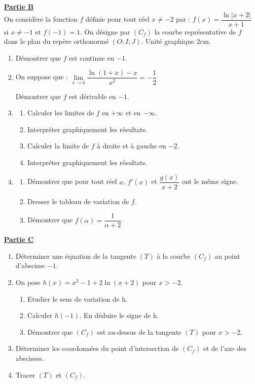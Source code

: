 \documentclass[12pt,a4paper]{article}
\begin{document}
\noindent \underline{\textbf{Partie B}} \\
On considère la fonction $f$ définie pour tout réel $x \neq -2$ par :
$f(x) = \dfrac{\ln|x + 2|}{x + 1}$ si $x \neq -1$ et $f(-1) = 1$.
On désigne par $(C_f)$ la courbe représentative de $f$ dans le plan du repère orthonormé $(O; I; J)$.
Unité graphique 2cm.
\begin{enumerate}
    \item Démontrer que $f$ est continue en $-1$.
    \item On suppose que : $\lim\limits_{x \to 0} \dfrac{\ln(1+x) - x}{x^2} = -\dfrac{1}{2}$
    
          Démontrer que $f$ est dérivable en $-1$.
    \item \begin{enumerate}
    			\item Calculer les limites de $f$ en $+\infty$ et en $-\infty$. 
    			\item Interpréter graphiquement les résultats. 
          \item Calculer la limite de $f$ à droite et à gauche en $-2$.
          \item Interpréter graphiquement les résultats.
    \end{enumerate}
    \item \begin{enumerate}
    			\item Démontrer que pour tout réel $x$, $f'(x)$ et $\dfrac{g(x)}{x+2}$ ont le même signe. 
          \item Dresser le tableau de variation de $f$. \\
          \item Démontrer que $f(\alpha) = \dfrac{1}{\alpha + 2}$.
    \end{enumerate}
\end{enumerate}

\vspace{0.3cm}

\noindent \underline{\textbf{Partie C}}
\begin{enumerate}
    \item Déterminer une équation de la tangente $(T)$ à la courbe $(C_f)$ au point d'abscisse $-1$.
    \item On pose $h(x) = x^2 - 1 + 2 \ln(x + 2)$ pour $x > -2$.
		\begin{enumerate}
    \item Etudier le sens de variation de h.
    \item Calculer $h(-1)$. En déduire le signe de h.
    \item Démontrer que $(C_f)$ est au-dessus de la tangente $(T)$ pour $x > -2$.
		\end{enumerate}
    \item Déterminer les coordonnées du point d'intersection de $(C_f)$ et de l'axe des abscisses.
    \item Tracer $(T)$ et $(C_f)$.
\end{enumerate}
\end{document}
